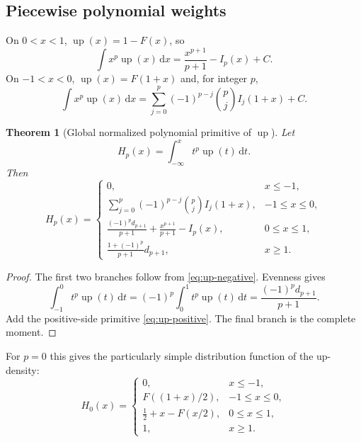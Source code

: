 \documentclass[11pt,oneside]{article}
\numberwithin{equation}{section}
\newtheorem{theorem}{Theorem}[section]
\theoremstyle{definition}
\theoremstyle{remark}
\newcommand{\Up}{\operatorname{up}}
\newcommand{\dd}{\,\mathrm d}
\begin{document}
\subsection{Piecewise polynomial weights}
On $0<x<1$, $\Up(x)=1-F(x)$, so
\begin{equation}
 \int x^p\Up(x)\dd x=\frac{x^{p+1}}{p+1}-I_p(x)+C.        \label{eq:up-positive}
\end{equation}
On $-1<x<0$, $\Up(x)=F(1+x)$ and, for integer $p$,
\begin{equation}
 \int x^p\Up(x)\dd x
 =\sum_{j=0}^{p}(-1)^{p-j}\binom pj I_j(1+x)+C.           \label{eq:up-negative}
\end{equation}

\begin{theorem}[Global normalized polynomial primitive of $\Up$]
\label{thm:up-global-primitive}
Let
\begin{equation}
 H_p(x)=\int_{-\infty}^{x}t^p\Up(t)\dd t.                 \label{eq:Hp-def}
\end{equation}
Then
\begin{equation}
 H_p(x)=
 \begin{cases}
 0,&x\le-1,\\[2pt]
 \displaystyle\sum_{j=0}^{p}(-1)^{p-j}\binom pjI_j(1+x),
   &-1\le x\le0,\\[8pt]
 \displaystyle\frac{(-1)^pd_{p+1}}{p+1}
 +\frac{x^{p+1}}{p+1}-I_p(x),&0\le x\le1,\\[9pt]
 \displaystyle\frac{1+(-1)^p}{p+1}d_{p+1},&x\ge1.
 \end{cases}                                               \label{eq:Hp-piecewise}
\end{equation}
\end{theorem}

\begin{proof}
The first two branches follow from \eqref{eq:up-negative}.  Evenness gives
\[
 \int_{-1}^{0}t^p\Up(t)\dd t
 =(-1)^p\int_0^1t^p\Up(t)\dd t
 =\frac{(-1)^pd_{p+1}}{p+1}.
\]
Add the positive-side primitive \eqref{eq:up-positive}.  The final branch is
the complete moment.
\end{proof}

For $p=0$ this gives the particularly simple distribution function of the
up-density:
\begin{equation}
 H_0(x)=
 \begin{cases}
 0,&x\le-1,\\
 F((1+x)/2),&-1\le x\le0,\\
 \frac12+x-F(x/2),&0\le x\le1,\\
 1,&x\ge1.
 \end{cases}                                               \label{eq:up-cdf}
\end{equation}
\end{document}
